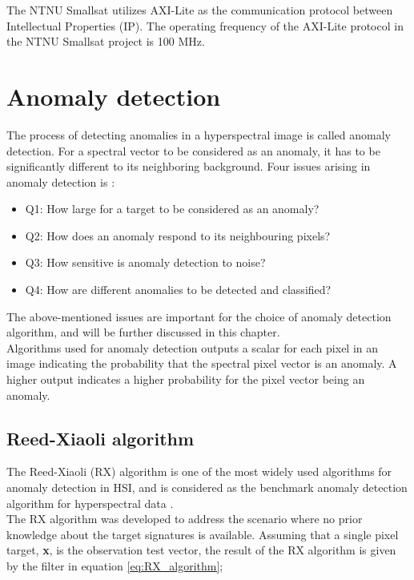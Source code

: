The NTNU Smallsat utilizes AXI-Lite as the communication protocol between Intellectual Properties (IP). The operating frequency of the AXI-Lite protocol in the NTNU Smallsat project is 100 MHz. 


\section{Anomaly detection}
\label{sec:anomaly_detectors_theory}
The process of detecting anomalies in a hyperspectral image is called anomaly detection. For a spectral vector to be considered as an anomaly, it has to be significantly different to its neighboring background. Four issues arising in anomaly detection is \cite{chang2006characterization}:
\\
 
\begin{itemize}
  \item Q1: How large for a target to be considered as an anomaly?
  \item Q2: How does an anomaly respond to its neighbouring pixels?
  \item Q3: How sensitive is anomaly detection to noise?
  \item Q4: How are different anomalies to be detected and classified?
\end{itemize}

The above-mentioned issues are important for the choice of anomaly detection algorithm, and will be further discussed in this chapter.
\\
Algorithms used for anomaly detection outputs a scalar for each pixel in an image indicating the probability that the spectral pixel vector is an anomaly. A higher output indicates a higher probability for the pixel vector being an anomaly.


\subsection{Reed-Xiaoli algorithm}
\label{sec:RX_theory}
The Reed-Xiaoli (RX) algorithm \cite{reed1990adaptive} is one of the most widely used algorithms for anomaly detection in HSI, and is considered as the benchmark anomaly detection algorithm for hyperspectral data \cite{yang2015dual}.  
\\
The RX algorithm was developed to address the scenario where no prior knowledge about the target signatures is available. Assuming that a single pixel target, \textbf{x}, is the observation test vector, the result of the RX algorithm is given by the filter in equation \ref{eq:RX_algorithm};

